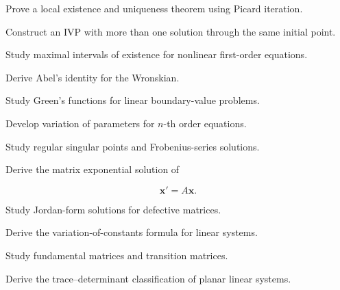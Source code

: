 \begin{exercise}[4]
Prove a local existence and uniqueness theorem using Picard iteration.
\end{exercise}

\begin{exercise}[4]
Construct an IVP with more than one solution through the same initial
point.
\end{exercise}

\begin{exercise}[4]
Study maximal intervals of existence for nonlinear first-order equations.
\end{exercise}

\begin{exercise}[4]
Derive Abel's identity for the Wronskian.
\end{exercise}

\begin{exercise}[4]
Study Green's functions for linear boundary-value problems.
\end{exercise}

\begin{exercise}[4]
Develop variation of parameters for \(n\)-th order equations.
\end{exercise}

\begin{exercise}[4]
Study regular singular points and Frobenius-series solutions.
\end{exercise}

\begin{exercise}[4]
Derive the matrix exponential solution of

\[
\mathbf{x}'=A\mathbf{x}.
\]
\end{exercise}

\begin{exercise}[4]
Study Jordan-form solutions for defective matrices.
\end{exercise}

\begin{exercise}[4]
Derive the variation-of-constants formula for linear systems.
\end{exercise}

\begin{exercise}[4]
Study fundamental matrices and transition matrices.
\end{exercise}

\begin{exercise}[4]
Derive the trace--determinant classification of planar linear systems.
\end{exercise}

